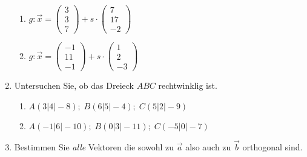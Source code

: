 \documentclass[12pt,a4paper,twoside,fleqn]{article}
\begin{document}
\begin{enumerate}
\begin{multicols}{2}
  \begin{enumerate}
  \item $g: \vec{x}=   
    \begin{pmatrix}
      3\\3\\7
    \end{pmatrix} 
    + s\cdot
    \begin{pmatrix}
      7\\17\\-2
    \end{pmatrix}$
  \item $g: \vec{x}=   
    \begin{pmatrix}
      -1\\11\\-1
    \end{pmatrix} 
    + s\cdot
    \begin{pmatrix}
      1\\2\\-3
    \end{pmatrix}$ 
  \end{enumerate}
\end{multicols}
\item Untersuchen Sie, ob das Dreieck $ABC$ rechtwinklig ist.
   \begin{enumerate}
  \item $A(3|4|-8);\; B(6|5|-4) ;\; C(5|2|-9)$
  \item $A(-1|6|-10);\; B(0|3|-11) ;\; C(-5|0|-7)$
  \end{enumerate}
\item Bestimmen Sie {\em alle} Vektoren die sowohl zu $\vec{a}$ also
  auch zu $\vec{b}$ orthogonal sind.
  \begin{multicols}{2}
\end{multicols}
\end{enumerate}
\end{document}
